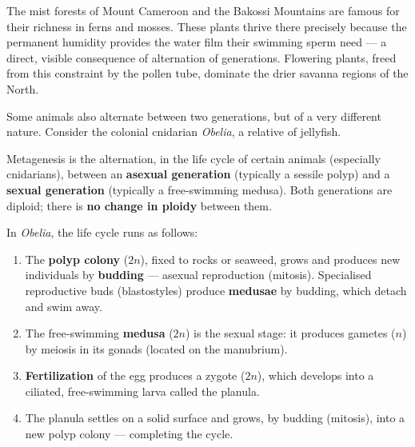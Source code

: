 \documentclass[11pt]{article}
\newcommand{\cle}[1]{{\popxbold\color{popdark}#1}}
\newcounter{popsec}
\newcounter{popsub}
\newcommand{\courssub}[1]{%
  \stepcounter{popsub}%
  \par\vspace{9pt}\noindent{\popxbold\fontsize{11.5}{13}\selectfont\color{popink}{\color{poporange}\thepopsec.\thepopsub}\hspace{6pt}#1}\par\nopagebreak\vspace{4pt}
}
\begin{document}
\begin{savaistu}
The mist forests of Mount Cameroon and the Bakossi Mountains are famous for their richness in ferns and mosses. These plants thrive there precisely because the permanent humidity provides the water film their swimming sperm need — a direct, visible consequence of alternation of generations. Flowering plants, freed from this constraint by the pollen tube, dominate the drier savanna regions of the North.
\end{savaistu}

\courssub{Metagenesis in Animals}

Some animals also alternate between two generations, but of a very different nature. Consider the colonial cnidarian \emph{Obelia}, a relative of jellyfish.

\begin{definition}[Metagenesis]
\cle{Metagenesis} is the alternation, in the life cycle of certain animals (especially cnidarians), between an \textbf{asexual generation} (typically a sessile \cle{polyp}) and a \textbf{sexual generation} (typically a free-swimming \cle{medusa}). Both generations are diploid; there is \textbf{no change in ploidy} between them.
\end{definition}

In \emph{Obelia}, the life cycle runs as follows:

\begin{enumerate}
\item The \textbf{polyp colony} ($2n$), fixed to rocks or seaweed, grows and produces new individuals by \textbf{budding} — asexual reproduction (mitosis). Specialised reproductive buds (blastostyles) produce \textbf{medusae} by budding, which detach and swim away.
\item The free-swimming \textbf{medusa} ($2n$) is the sexual stage: it produces gametes ($n$) by meiosis in its gonads (located on the manubrium).
\item \textbf{Fertilization} of the egg produces a zygote ($2n$), which develops into a ciliated, free-swimming larva called the \cle{planula}.
\item The planula settles on a solid surface and grows, by budding (mitosis), into a new polyp colony — completing the cycle.
\end{enumerate}
\end{document}
